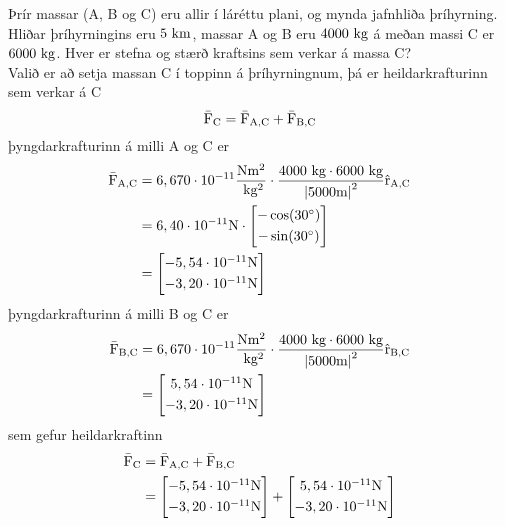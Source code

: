 \begin{formalexample}
Þrír massar (A, B og C) eru allir í láréttu plani, og mynda jafnhliða þríhyrning. Hliðar
þríhyrningins eru $5 \textrm{ k}\textrm{m}$, massar A og B eru $4000 \textrm{ k}\textrm{g}$ á meðan
massi C er $6000 \textrm{ k}\textrm{g}$. Hver er stefna og stærð kraftsins sem verkar á
massa C?
\\[4 ex]
Valið er að setja massan C í toppinn á þríhyrningnum, þá er heildarkrafturinn sem
verkar á C
\[
	\bar{\textrm{F}}_\text{C} = \bar{\textrm{F}}_\text{A,C} + \bar{\textrm{F}}_\text{B,C}
\]
þyngdarkrafturinn á milli A og C er
\begin{align*}
	\bar{\textrm{F}}_\text{A,C} &= 6,670 \cdot 10^{-11} \frac{\textrm{N} \textrm{m}^2}{\textrm{ k}\textrm{g}^2} \cdot
		\frac{4000 \textrm{ k}\textrm{g} \cdot 6000 \textrm{ k}\textrm{g}}{\left|5000 \textrm{m}\right|^2} \hat {\textrm{r}}_\text{A,C} \\
	&= 6,40 \cdot 10^{-11} \textrm{N} \cdot 
		\begin{bmatrix}
			-\cos(30 ^{\circ}) \\[0.3em]
			-\sin(30 ^{\circ}) 
		\end{bmatrix} \\
	&=	\begin{bmatrix}
			- 5,54 \cdot 10^{-11} \textrm{N} \\[0.3em]
			- 3,20 \cdot 10^{-11} \textrm{N}
		\end{bmatrix}
\end{align*}
þyngdarkrafturinn á milli B og C er
\begin{align*}
	\bar{\textrm{F}}_\text{B,C} &= 6,670 \cdot 10^{-11} \frac{\textrm{N} \textrm{m}^2}{\textrm{ k}\textrm{g}^2} \cdot
		\frac{4000 \textrm{ k}\textrm{g} \cdot 6000 \textrm{ k}\textrm{g}}{\left|5000 \textrm{m}\right|^2} \hat {\textrm{r}}_\text{B,C} \\
	&=	\begin{bmatrix}
			5,54 \cdot 10^{-11} \textrm{N} \\[0.3em]
			- 3,20 \cdot 10^{-11} \textrm{N}
		\end{bmatrix}
\end{align*}
sem gefur heildarkraftinn
\begin{align*}
	\bar\uforce_\text{C} &= \bar\uforce_\text{A,C} + \bar\uforce_\text{B,C} \\
		&= 
		\begin{bmatrix}
			- \uEE{5,54}{-11} \unewton \\[0.3em]
			- \uEE{3,20}{-11} \unewton
		\end{bmatrix}
		+
		\begin{bmatrix}
			\uEE{5,54}{-11} \unewton \\[0.3em]
			- \uEE{3,20}{-11} \unewton
		\end{bmatrix} \\

\end{align*}
\end{formalexample}
